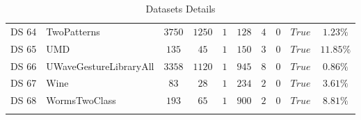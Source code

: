 {\begin{longtable}{|ll|cccccccc|}
		DS 64 & TwoPatterns & $3750$ & $1250$ & $1$ & $128$ & $4$ & $0$ & $True$ & $1.23\%$ \\
		DS 65 & UMD & $135$ & $45$ & $1$ & $150$ & $3$ & $0$ & $True$ & $11.85\%$ \\
		DS 66 & UWaveGestureLibraryAll & $3358$ & $1120$ & $1$ & $945$ & $8$ & $0$ & $True$ & $0.86\%$ \\
		DS 67 & Wine & $83$ & $28$ & $1$ & $234$ & $2$ & $0$ & $True$ & $3.61\%$ \\
		DS 68 & WormsTwoClass & $193$ & $65$ & $1$ & $900$ & $2$ & $0$ & $True$ & $8.81\%$ \\
		\hline
		\caption{Datasets Details}
		\label{tab:datasets-details}
	\end{longtable}
}
